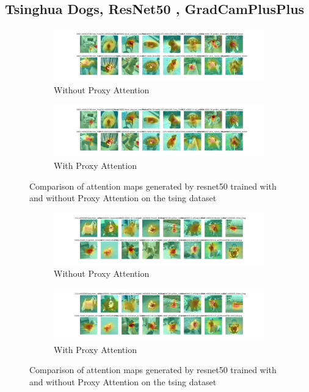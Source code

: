\subsection{Tsinghua Dogs, ResNet50 , GradCamPlusPlus}

\begin{figure}[!htb]
    \centering
    \begin{subfigure}[b]{1\textwidth}
        \includegraphics[width=\textwidth]{images/gpp_tsing_resnet50_noproxy_1.pdf}
        \caption{Without Proxy Attention}
    \end{subfigure}
    \hfill
    \begin{subfigure}[b]{1\textwidth}
        \includegraphics[width=\textwidth]{images/gpp_tsing_resnet50_proxy_1.pdf}
        \caption{With Proxy Attention}
    \end{subfigure}
    \caption{Comparison of attention maps generated by resnet50 trained with and without Proxy Attention on the tsing dataset}
\end{figure}


\begin{figure}[!htb]
    \centering
    \begin{subfigure}[b]{1\textwidth}
        \includegraphics[width=\textwidth]{images/gpp_tsing_resnet50_noproxy_2.pdf}
        \caption{Without Proxy Attention}
    \end{subfigure}
    \hfill
    \begin{subfigure}[b]{1\textwidth}
        \includegraphics[width=\textwidth]{images/gpp_tsing_resnet50_proxy_2.pdf}
        \caption{With Proxy Attention}
    \end{subfigure}
    \caption{Comparison of attention maps generated by resnet50 trained with and without Proxy Attention on the tsing dataset}
\end{figure}


